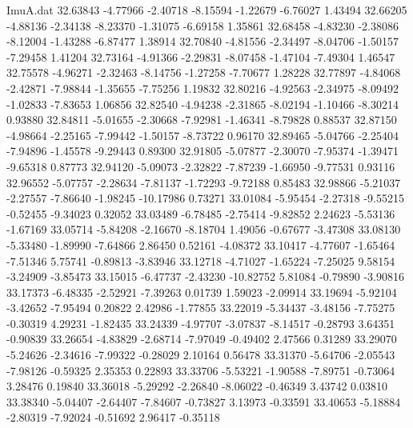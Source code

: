 \begin{filecontents}{ImuA.dat}
  32.63843   -4.77966   -2.40718   -8.15594   -1.22679   -6.76027    1.43494
  32.66205   -4.88136   -2.34138   -8.23370   -1.31075   -6.69158    1.35861
  32.68458   -4.83230   -2.38086   -8.12004   -1.43288   -6.87477    1.38914
  32.70840   -4.81556   -2.34497   -8.04706   -1.50157   -7.29458    1.41204
  32.73164   -4.91366   -2.29831   -8.07458   -1.47104   -7.49304    1.46547
  32.75578   -4.96271   -2.32463   -8.14756   -1.27258   -7.70677    1.28228
  32.77897   -4.84068   -2.42871   -7.98844   -1.35655   -7.75256    1.19832
  32.80216   -4.92563   -2.34975   -8.09492   -1.02833   -7.83653    1.06856
  32.82540   -4.94238   -2.31865   -8.02194   -1.10466   -8.30214    0.93880
  32.84811   -5.01655   -2.30668   -7.92981   -1.46341   -8.79828    0.88537
  32.87150   -4.98664   -2.25165   -7.99442   -1.50157   -8.73722    0.96170
  32.89465   -5.04766   -2.25404   -7.94896   -1.45578   -9.29443    0.89300
  32.91805   -5.07877   -2.30070   -7.95374   -1.39471   -9.65318    0.87773
  32.94120   -5.09073   -2.32822   -7.87239   -1.66950   -9.77531    0.93116
  32.96552   -5.07757   -2.28634   -7.81137   -1.72293   -9.72188    0.85483
  32.98866   -5.21037   -2.27557   -7.86640   -1.98245  -10.17986    0.73271
  33.01084   -5.95454   -2.27318   -9.55215   -0.52455   -9.34023    0.32052
  33.03489   -6.78485   -2.75414   -9.82852    2.24623   -5.53136   -1.67169
  33.05714   -5.84208   -2.16670   -8.18704    1.49056   -0.67677   -3.47308
  33.08130   -5.33480   -1.89990   -7.64866    2.86450    0.52161   -4.08372
  33.10417   -4.77607   -1.65464   -7.51346    5.75741   -0.89813   -3.83946
  33.12718   -4.71027   -1.65224   -7.25025    9.58154   -3.24909   -3.85473
  33.15015   -6.47737   -2.43230  -10.82752    5.81084   -0.79890   -3.90816
  33.17373   -6.48335   -2.52921   -7.39263    0.01739    1.59023   -2.09914
  33.19694   -5.92104   -3.42652   -7.95494    0.20822    2.42986   -1.77855
  33.22019   -5.34437   -3.48156   -7.75275   -0.30319    4.29231   -1.82435
  33.24339   -4.97707   -3.07837   -8.14517   -0.28793    3.64351   -0.90839
  33.26654   -4.83829   -2.68714   -7.97049   -0.49402    2.47566    0.31289
  33.29070   -5.24626   -2.34616   -7.99322   -0.28029    2.10164    0.56478
  33.31370   -5.64706   -2.05543   -7.98126   -0.59325    2.35353    0.22893
  33.33706   -5.53221   -1.90588   -7.89751   -0.73064    3.28476    0.19840
  33.36018   -5.29292   -2.26840   -8.06022   -0.46349    3.43742    0.03810
  33.38340   -5.04407   -2.64407   -7.84607   -0.73827    3.13973   -0.33591
  33.40653   -5.18884   -2.80319   -7.92024   -0.51692    2.96417   -0.35118

\end{filecontents}
